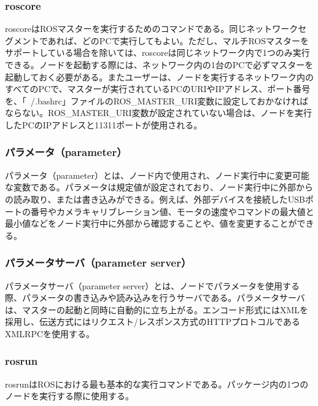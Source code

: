 \subsubsection{roscore}
roscoreはROSマスターを実行するためのコマンドである。同じネットワークセグメントであれば、どのPCで実行してもよい。ただし、マルチROSマスターをサポートしている場合を除いては、roscoreは同じネットワーク内で1つのみ実行できる。ノードを起動する際には、ネットワーク内の1台のPCで必ずマスターを起動しておく必要がある。またユーザーは、ノードを実行するネットワーク内のすべてのPCで、マスターが実行されているPCのURIやIPアドレス、ポート番号を、「~/.bashrc」ファイルのROS\_MASTER\_URI変数に設定しておかなければならない。ROS\_MASTER\_URI変数が設定されていない場合は、ノードを実行したPCのIPアドレスと11311ポートが使用される。

\subsubsection{パラメータ（parameter）}
パラメータ（parameter）とは、ノード内で使用され、ノード実行中に変更可能な変数である。パラメータは規定値が設定されており、ノード実行中に外部からの読み取り、または書き込みができる。例えば、外部デバイスを接続したUSBポートの番号やカメラキャリブレーション値、モータの速度やコマンドの最大値と最小値などをノード実行中に外部から確認することや、値を変更することができる。

\subsubsection{パラメータサーバ（parameter server）}
パラメータサーバ（parameter server）とは、ノードでパラメータを使用する際、パラメータの書き込みや読み込みを行うサーバである。パラメータサーバは、マスターの起動と同時に自動的に立ち上がる。エンコード形式にはXMLを採用し、伝送方式にはリクエスト/レスポンス方式のHTTPプロトコルであるXMLRPCを使用する。

\subsubsection{rosrun}
rosrunはROSにおける最も基本的な実行コマンドである。パッケージ内の1つのノードを実行する際に使用する。

